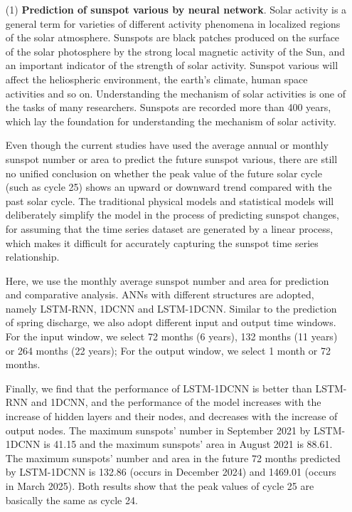 \begin{enumerate}

  \item[(1)] \textbf{Prediction of sunspot various by neural network}. Solar activity is a general term for varieties of different activity phenomena in localized regions of the solar atmosphere. Sunspots are black patches produced on the surface of the solar photosphere by the strong local magnetic activity of the Sun, and an important indicator of the strength of solar activity. Sunspot various will affect the heliospheric environment, the earth's climate, human space activities and so on. Understanding the mechanism of solar activities is one of the tasks of many researchers. Sunspots are recorded more than 400 years, which lay the foundation for understanding the mechanism of solar activity. 
 
  Even though the current studies have used the average annual or monthly sunspot number or area to predict the future sunspot various, there are still no unified conclusion on whether the peak value of the future solar cycle (such as cycle 25) shows an upward or downward trend compared with the past solar cycle. The traditional physical models and statistical models will deliberately simplify the model in the process of predicting sunspot changes, for assuming that the time series dataset are generated by a linear process, which makes it difficult for accurately capturing the sunspot time series relationship.

  Here, we use the monthly average sunspot number and area for prediction and comparative analysis. ANNs with different structures are adopted, namely LSTM-RNN, 1DCNN and LSTM-1DCNN. Similar to the prediction of spring discharge, we also adopt different input and output time windows. For the input window, we select 72 months (6 years), 132 months (11 years) or 264 months (22 years);  For the output window, we select 1 month or 72 months.

  Finally, we find that the performance of LSTM-1DCNN is better than LSTM-RNN and 1DCNN, and the performance of the model increases with the increase of hidden layers and their nodes, and decreases with the increase of output nodes. The maximum sunspots' number in September 2021 by LSTM-1DCNN is 41.15 and the maximum sunspots' area in August 2021 is 88.61. The maximum sunspots' number and area in the future 72 months predicted by LSTM-1DCNN is 132.86 (occurs in December 2024) and 1469.01 (occurs in March 2025). Both results show that the peak values of cycle 25 are basically the same as cycle 24. 


\end{enumerate}
